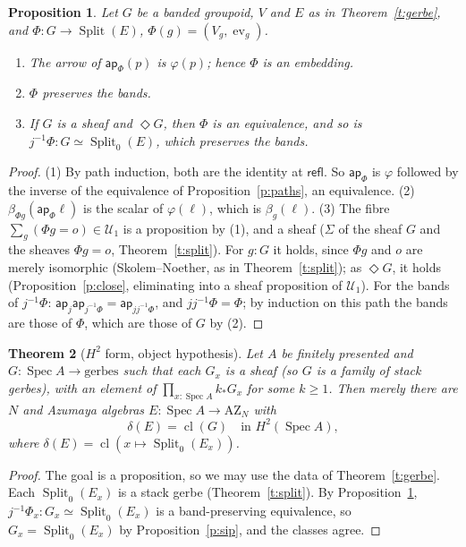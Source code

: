 \documentclass[11pt]{amsart}
\newtheorem{theorem}{Theorem}[section]
\newtheorem{proposition}[theorem]{Proposition}
\theoremstyle{definition}
\theoremstyle{remark}
\newcommand{\Spec}{\operatorname{Spec}}
\newcommand{\Split}{\operatorname{Split}}
\newcommand{\cl}{\operatorname{cl}}
\newcommand{\ev}{\operatorname{ev}}
\newcommand{\close}{\Diamond}
\newcommand{\U}{\mathcal U}
\newcommand{\ap}{\mathsf{ap}}
\begin{document}
\begin{proposition}\label{p:phi}
Let $G$ be a banded groupoid, $V$ and $E$ as in Theorem~\ref{t:gerbe}, and
$\Phi:G\to\Split(E)$, $\Phi(g)=(V_g,\ev_g)$.
\begin{enumerate}
\item The arrow of $\ap_\Phi(p)$ is $\varphi(p)$; hence $\Phi$ is an
embedding.
\item $\Phi$ preserves the bands.
\item If $G$ is a sheaf and $\close G$, then $\Phi$ is an equivalence, and
so is $j^{-1}\Phi:G\simeq\Split_0(E)$, which preserves the bands.
\end{enumerate}
\end{proposition}
\begin{proof}
(1) By path induction, both are the identity at $\mathsf{refl}$. So
$\ap_\Phi$ is $\varphi$ followed by the inverse of the equivalence of
Proposition~\ref{p:paths}, an equivalence.
(2) $\beta_{\Phi g}(\ap_\Phi\ell)$ is the scalar of $\varphi(\ell)$, which
is $\beta_g(\ell)$.
(3) The fibre $\sum_g(\Phi g=o)\in\U_1$ is a proposition by (1), and a
sheaf ($\Sigma$ of the sheaf $G$ and the sheaves $\Phi g=o$,
Theorem~\ref{t:split}). For $g:G$ it holds, since $\Phi g$ and $o$ are
merely isomorphic (Skolem--Noether, as in Theorem~\ref{t:split}); as
$\close G$, it holds (Proposition~\ref{p:close}, eliminating into a sheaf
proposition of $\U_1$). For the bands of $j^{-1}\Phi$: $\ap_j\ap_{j^{-1}\Phi}=
\ap_{jj^{-1}\Phi}$, and $jj^{-1}\Phi=\Phi$; by induction on this path the
bands are those of $\Phi$, which are those of $G$ by (2).
\end{proof}

\begin{theorem}[$H^2$ form, object hypothesis]\label{t:main}
Let $A$ be finitely presented and $G:\Spec A\to\text{gerbes}$ such
that each $G_x$ is a sheaf (so $G$ is a family of stack gerbes), with an
element of $\prod_{x:\Spec A}k_*G_x$ for some $k\geq1$. Then merely there are $N$ and
Azumaya algebras $E:\Spec A\to\mathrm{AZ}_N$ with
\[\delta(E)=\cl(G)\quad\text{in } H^2(\Spec A),\]
where $\delta(E)=\cl(x\mapsto\Split_0(E_x))$.
\end{theorem}
\begin{proof}
The goal is a proposition, so we may use the data of
Theorem~\ref{t:gerbe}. Each $\Split_0(E_x)$ is a stack gerbe
(Theorem~\ref{t:split}). By Proposition~\ref{p:phi}, $j^{-1}\Phi_x:G_x\simeq
\Split_0(E_x)$ is a band-preserving equivalence, so $G_x=\Split_0(E_x)$ by
Proposition~\ref{p:sip}, and the classes agree.
\end{proof}
\end{document}
